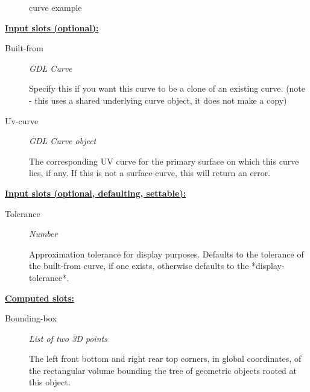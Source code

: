 \documentclass [11pt]{book}
\begin{document}
\begin{itemize}
\begin{figure}
\caption{curve example}

\label{fig:curve}

\end{figure}





\textbf{
\underline{Input slots (optional):}}

\begin{description}

\item [Built-from]
\emph{GDL Curve}

 Specify this if you want this curve to be a clone of
an existing curve. (note - this uses a shared underlying curve object,
it does not make a copy)




\item [Uv-curve]
\emph{GDL Curve object}

 The corresponding UV curve for the primary surface on which this curve lies, if any. If
this is not a surface-curve, this will return an error.




\end{description}






\textbf{
\underline{Input slots (optional, defaulting, settable):}}

\begin{description}

\item [Tolerance]
\emph{Number}

 Approximation tolerance for display purposes. Defaults to the tolerance of the
built-from curve, if one exists, otherwise defaults to the *display-tolerance*.




\end{description}






\textbf{
\underline{Computed slots:}}

\begin{description}

\item [Bounding-box]
\emph{List of two 3D points}

 The left front bottom and right rear top corners, in global coordinates,
of the rectangular volume bounding the tree of geometric objects rooted at this object.





\end{description}
\end{itemize}
\end{document}
